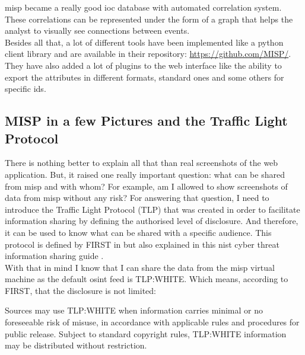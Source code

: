 \documentclass{eplmastersthesis}
\begin{document}
\gls{misp} became a really good \gls{ioc} database with automated correlation system. These correlations can be represented under the form of a graph that helps the analyst to visually see connections between events.\\

Besides all that, a lot of different tools have been implemented like a python client library and are available in their repository: \url{https://github.com/MISP/}.
They have also added a lot of plugins to the web interface like the ability to export the attributes in different formats, standard ones and some others for specific \gls{ids}.\\



\subsection{MISP in a few Pictures and the Traffic Light Protocol}
There is nothing better to explain all that than real screenshots of the web application. But, it raised one really important question: what can be shared from \gls{misp} and with whom?
For example, am I allowed to show screenshots of data from \gls{misp} without any risk?
For answering that question, I need to introduce the Traffic Light Protocol (TLP) that was created in order to facilitate information sharing by defining the authorised level of disclosure. And therefore, it can be used to know what can be shared with a specific audience.
This protocol is defined by FIRST in \cite{FirstTLP} but also explained in this \gls{nist} cyber threat information sharing guide \cite{johnson2016guide}.\\

With that in mind I know that I can share the data from the \gls{misp} virtual machine as the default \gls{osint} feed is TLP:WHITE. Which means, according to FIRST, that the disclosure is not limited: \\

\begin{boxedverbatim}
	Sources may use TLP:WHITE when information carries minimal or no foreseeable 
	risk of misuse, in accordance with applicable rules and procedures for public 
	release. Subject to standard copyright rules, TLP:WHITE information may be 
	distributed without restriction.
\end{boxedverbatim}
\end{document}
